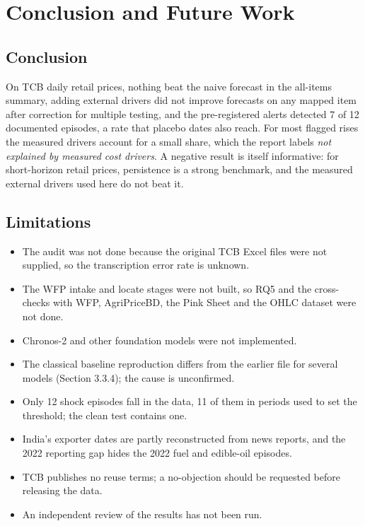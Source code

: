 \documentclass[12pt]{report}
\newcommand{\unexpl}{\emph{not explained by measured cost drivers}}
\begin{document}
\chapter{Conclusion and Future Work}

\section{Conclusion}
On TCB daily retail prices, nothing beat the naive forecast in the all-items summary, adding external drivers did not improve forecasts on any mapped item after correction for multiple testing, and the pre-registered alerts detected 7 of 12 documented episodes, a rate that placebo dates also reach. For most flagged rises the measured drivers account for a small share, which the report labels \unexpl. A negative result is itself informative: for short-horizon retail prices, persistence is a strong benchmark, and the measured external drivers used here do not beat it.

\section{Limitations}\label{sec:limits}
\begin{itemize}
\item The audit was not done because the original TCB Excel files were not supplied, so the transcription error rate is unknown.
\item The WFP intake and locate stages were not built, so RQ5 and the cross-checks with WFP, AgriPriceBD, the Pink Sheet and the OHLC dataset were not done.
\item Chronos-2 and other foundation models were not implemented.
\item The classical baseline reproduction differs from the earlier file for several models (Section 3.3.4); the cause is unconfirmed.
\item Only 12 shock episodes fall in the data, 11 of them in periods used to set the threshold; the clean test contains one.
\item India's exporter dates are partly reconstructed from news reports, and the 2022 reporting gap hides the 2022 fuel and edible-oil episodes.
\item TCB publishes no reuse terms; a no-objection should be requested before releasing the data.
\item An independent review of the results has not been run.
\end{itemize}
\end{document}
